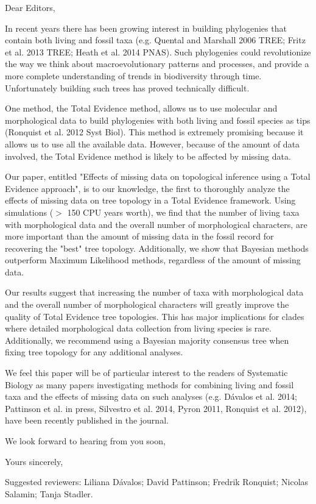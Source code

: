 \documentclass[11pt]{letter}
\begin{document}
\begin{letter}{}
\opening{Dear Editors,}

In recent years there has been growing interest in building phylogenies that contain both living and fossil taxa (e.g. Quental and Marshall 2006 TREE; Fritz et al. 2013 TREE; Heath et al. 2014 PNAS). Such phylogenies could revolutionize the way we think about macroevolutionary patterns and processes, and provide a more complete understanding of trends in biodiversity through time. Unfortunately building such trees has proved technically difficult. 

One method, the Total Evidence method, allows us to use molecular and morphological data to build phylogenies with both living and fossil species as tips (Ronquist et al. 2012 Syst Biol). This method is extremely promising because it allows us to use all the available data. However, because of the amount of data involved, the Total Evidence method is likely to be affected by missing data.

Our paper, entitled "Effects of missing data on topological inference using a Total Evidence approach", is to our knowledge, the first to thoroughly analyze the effects of missing data on tree topology in a Total Evidence framework. Using simulations ($>$ 150 CPU years worth), we find that the number of living taxa with morphological data and the overall number of morphological characters, are more important than the amount of missing data in the fossil record for recovering the "best" tree topology. Additionally, we show that Bayesian methods outperform Maximum Likelihood methods, regardless of the amount of missing data.

Our results suggest that increasing the number of taxa with morphological data and the overall number of morphological characters will greatly improve the quality of Total Evidence tree topologies. This has major implications for clades where detailed morphological data collection from living species is rare. Additionally, we recommend using a Bayesian majority consensus tree when fixing tree topology for any additional analyses.

We feel this paper will be of particular interest to the readers of Systematic Biology as many papers investigating methods for combining living and fossil taxa and the effects of missing data on such analyses (e.g. D\'{a}valos et al. 2014; Pattinson et al. in press, Silvestro et al. 2014, Pyron 2011, Ronquist et al. 2012), have been recently published in the journal.

We look forward to hearing from you soon,

\closing{Yours sincerely,}

Suggested reviewers: Liliana D\'{a}valos; David Pattinson; Fredrik Ronquist; Nicolas Salamin; Tanja Stadler.

\end{letter}
\end{document}

